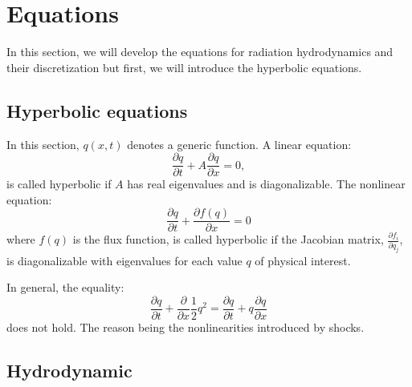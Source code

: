 \chapter{Equations}
In this section, we will develop the equations for radiation hydrodynamics and
their discretization but first, we will introduce the hyperbolic equations.
\section{Hyperbolic equations} \label{hyperbolic_equations}
In this section, $q(x,t)$ denotes a generic function. A linear equation:
\begin{equation}
  \frac{\partial q}{\partial t} + A \frac{\partial q}{\partial x}  = 0,
\end{equation}
is called hyperbolic if $A$ has real eigenvalues and is diagonalizable. The
nonlinear equation:
\begin{equation}
  \frac{\partial q}{\partial t} + \frac{\partial f(q)}{\partial x} =0
\end{equation}
where $f(q)$ is the flux function, is called hyperbolic if the Jacobian matrix,
$\frac{\partial f_i}{\partial q_j}$, is diagonalizable with eigenvalues for each
value $q$ of physical interest.

In general, the equality:
\begin{equation}
  \frac{\partial q}{\partial t} + \frac{\partial}{\partial x}\frac{1}{2} q^2 =
  \frac{\partial q}{\partial t} + q \frac{\partial q}{\partial x}
\end{equation}
does not hold. The reason being the nonlinearities introduced by shocks.

\section{Hydrodynamic}
